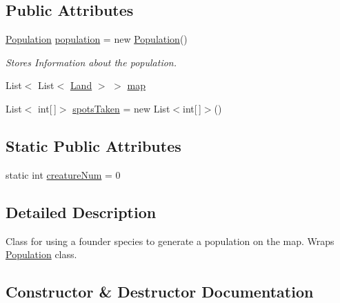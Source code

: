 \subsection*{Public Attributes}
\begin{DoxyCompactItemize}
\item 
\mbox{\hyperlink{class_population}{Population}} \mbox{\hyperlink{class_species_populator_a119d16beaafe55f1a49d26daa08fcc5a}{population}} = new \mbox{\hyperlink{class_population}{Population}}()
\begin{DoxyCompactList}\small\item\em Stores Information about the population. \end{DoxyCompactList}\item 
List$<$ List$<$ \mbox{\hyperlink{class_land}{Land}} $>$ $>$ \mbox{\hyperlink{class_species_populator_a886b0f7ecb2a21621178d68b00d637e3}{map}}
\item 
List$<$ int\mbox{[}$\,$\mbox{]}$>$ \mbox{\hyperlink{class_species_populator_a795ce62b0794ced8ac231dab8a836c1d}{spots\+Taken}} = new List$<$int\mbox{[}$\,$\mbox{]}$>$()
\end{DoxyCompactItemize}
\subsection*{Static Public Attributes}
\begin{DoxyCompactItemize}
\item 
static int \mbox{\hyperlink{class_species_populator_ae63e5d9d4b3d8e83bf1c3c288d34a4d9}{creature\+Num}} = 0
\end{DoxyCompactItemize}


\subsection{Detailed Description}
Class for using a founder species to generate a population on the map. Wraps \mbox{\hyperlink{class_population}{Population}} class. 



\subsection{Constructor \& Destructor Documentation}
\mbox{\label{class_species_populator_aa3187e4e8906a10d15365aafddd183f4}} 
